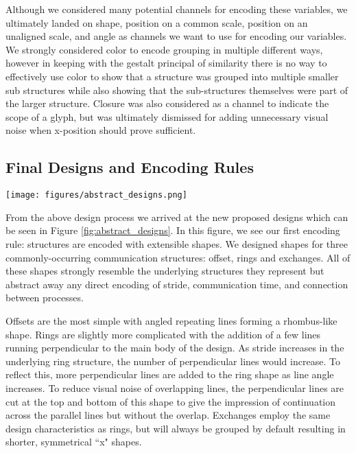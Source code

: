 Although we considered many potential channels for encoding these variables, we ultimately landed on shape, position on a common scale, position on an unaligned scale, and angle as channels we want to use for encoding our variables. We strongly considered color to encode grouping in multiple different ways, however in keeping with the gestalt principal of similarity there is no way to effectively use color to show that a structure was grouped into multiple smaller sub structures while also showing that the sub-structures themselves were part of the larger structure. Closure was also considered as a channel to indicate the scope of a glyph, but was ultimately dismissed for adding unnecessary visual noise when x-position should prove sufficient.

\subsection{Final Designs and Encoding Rules}

\begin{figure*}
    \centering
    \texttt{[image: figures/abstract\_designs.png]}
    \caption{A breakdown of the new designs . . . }
    \label{fig:abstract_designs}
\end{figure*}

From the above design process we arrived at the new proposed designs which can be seen in Figure \ref{fig:abstract_designs}. In this figure, we see our first encoding rule: structures are encoded with extensible shapes. We designed shapes for three commonly-occurring communication structures: offset, rings and exchanges. All of these shapes strongly resemble the underlying structures they represent but abstract away any direct encoding of stride, communication time, and connection between processes.

Offsets are the most simple with angled repeating lines forming a rhombus-like shape. Rings are slightly more complicated with the addition of a few lines running perpendicular to the main body of the design. As stride increases in the underlying ring structure, the number of perpendicular lines would increase. To reflect this, more perpendicular lines are added to the ring shape as line angle increases. To reduce visual noise of overlapping lines, the perpendicular lines are cut at the top and bottom of this shape to give the impression of continuation across the parallel lines but without the overlap. Exchanges employ the same design characteristics as rings, but will always be grouped by default resulting in shorter, symmetrical ``x" shapes. 

